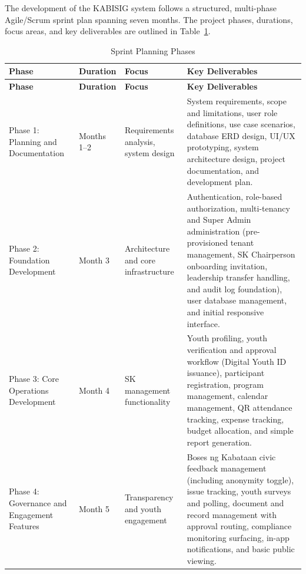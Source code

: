 \hspace*{\parindent}The development of the KABISIG system follows a structured, multi-phase Agile/Scrum sprint plan spanning seven months. The project phases, durations, focus areas, and key deliverables are outlined in Table~\ref{tab:sprint_planning_phases}.

\begin{longtable}{|p{3cm}|p{2cm}|p{3.5cm}|p{6cm}|}
\caption{Sprint Planning Phases}
\label{tab:sprint_planning_phases} \\
\hline
\textbf{Phase} & \textbf{Duration} & \textbf{Focus} & \textbf{Key Deliverables} \\ \hline
\endfirsthead

\hline
\textbf{Phase} & \textbf{Duration} & \textbf{Focus} & \textbf{Key Deliverables} \\ \hline
\endhead

\hline
\endfoot

Phase 1: Planning and Documentation & Months 1--2 & Requirements analysis, system design & System requirements, scope and limitations, user role definitions, use case scenarios, database ERD design, UI/UX prototyping, system architecture design, project documentation, and development plan. \\ \hline

Phase 2: Foundation Development & Month 3 & Architecture and core infrastructure & Authentication, role-based authorization, multi-tenancy and Super Admin administration (pre-provisioned tenant management, SK Chairperson onboarding invitation, leadership transfer handling, and audit log foundation), user database management, and initial responsive interface. \\ \hline

Phase 3: Core Operations Development & Month 4 & SK management functionality & Youth profiling, youth verification and approval workflow (Digital Youth ID issuance), participant registration, program management, calendar management, QR attendance tracking, expense tracking, budget allocation, and simple report generation. \\ \hline

Phase 4: Governance and Engagement Features & Month 5 & Transparency and youth engagement & Boses ng Kabataan civic feedback management (including anonymity toggle), issue tracking, youth surveys and polling, document and record management with approval routing, compliance monitoring surfacing, in-app notifications, and basic public viewing. \\ \hline


\end{longtable}
